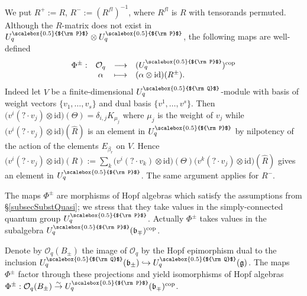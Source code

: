 \documentclass[11pt]{amsart}
\newcommand{\fonc}[5]{                     %
            \begin{array}{rcll}#1 :& #2 & \longrightarrow & #3 \\   %
                         &#4 &\longmapsto & #5          %
            \end{array}}
\newcommand{\Oo}{\mathcal{O}}
\newcommand{\Q}{{\scalebox{0.5}{${\rm Q}$}}}
\newcommand{\Pup}{{\scalebox{0.5}{${\rm P}$}}}
\begin{document}
We put $R^+:=R$, $R^- := (R^{fl})^{-1}$, where $R^{fl}$ is $R$ with tensorands permuted. Although the $R$-matrix does not exist in $U_q^\Pup \otimes U_q^\Pup$, the following maps are well-defined 
\begin{equation}\label{phipmdebut}
\fonc{\Phi^\pm}{\Oo_q}{(U_q^\Pup)^{\rm cop}}{\alpha}{(\alpha \otimes \mathrm{id})(R^\pm).}
\end{equation}
Indeed let $V$ be a finite-dimensional $U_q^\Q$-module with basis of weight vectors $\{ v_1, \ldots, v_s \}$ and dual basis $\{ v^1, \ldots, v^s \}$. Then $\bigl( v^i(? \cdot v_j) \otimes \mathrm{id} \bigr)(\Theta) = \delta_{i,j}K_{\mu_j}$ where $\mu_j$ is the weight of $v_j$ while $\bigl( v^i(? \cdot v_j) \otimes \mathrm{id} \bigr)(\hat{R})$ is an element in $U_q^\Pup$ by nilpotency of the action of the elements $E_{\beta_r}$ on $V$. Hence $\bigl( v^i(? \cdot v_j) \otimes \mathrm{id} \bigr)(R) := \textstyle \sum_k\bigl( v^i(? \cdot v_k) \otimes \mathrm{id} \bigr)(\Theta) \bigl( v^k(? \cdot v_j) \otimes \mathrm{id} \bigr)(\hat{R})$ gives an element in $U_q^\Pup$. The same argument applies for $R^-$.

\indent The maps $\Phi^{\pm}$ are morphisms of Hopf algebras which satisfy the assumptions from \S\ref{subsecSubstQuasi}; we stress that they take values in the simply-connected quantum group $U_q^\Pup$. Actually $\Phi^\pm$ takes values in the subalgebra $U_q^\Pup(\mathfrak{b}_\mp)^{\rm cop}$.

\indent Denote by $\Oo_q(B_\pm)$ the image of $\Oo_q$ by the Hopf epimorphism dual to the inclusion $U_q^\Q(\mathfrak{b}_\pm)\hookrightarrow U_q^\Q(\mathfrak{g})$. The maps $\Phi^\pm$ factor through these projections and yield isomorphisms of Hopf algebras $\Phi^\pm : \Oo_q(B_\pm) \overset{\sim}{\rightarrow} U_q^\Pup(\mathfrak{b}_\mp)^{\mathrm{cop}}$.

\smallskip
\end{document}
